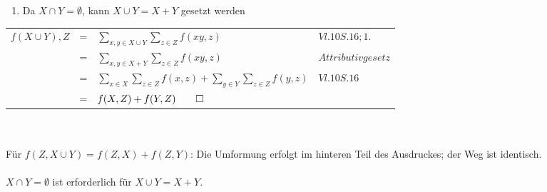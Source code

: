 \documentclass{article}
\begin{document}
\begin{enumerate}
	\item Da $X \cap Y=\emptyset$, kann $X \cup Y = X + Y$ gesetzt werden 
\end{enumerate}
\begin{tabular}{llll}
$f(X\cup Y), Z$ &=&$\underset{x,y\in X\cup Y}{\sum}\underset{z \in Z}{\sum}f(xy,z)$&$Vl. 10 S. 16; 1.$\\
	&=&$\underset{x,y\in X + Y}{\sum}\underset{z \in Z}{\sum}f(xy,z)$&$Attributivgesetz$\\
	&=&$\underset{x \in X}{\sum}\underset{z \in Z}{\sum}f(x,z) + \underset{y \in Y}{\sum}\underset{z \in Z}{\sum}f(y,z)$&$Vl. 10 S. 16$\\
	&=&$f(X,Z)+f(Y,Z)\qed$
\end{tabular}\\\\
Für $f(Z,X\cup Y) = f(Z,X)+f(Z,Y)$: Die Umformung erfolgt im hinteren Teil des Ausdruckes; der Weg ist identisch.\\
\\
$X \cap Y=\emptyset$ ist erforderlich für $X \cup Y = X + Y$.
\end{document}
